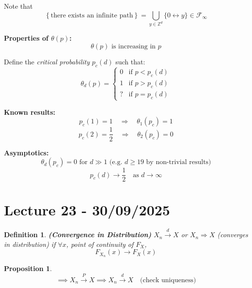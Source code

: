 \documentclass{article}
\newcommand{\1}{\mathds{1}}
\newtheorem{proposition}[theorem]{Proposition}
\newtheorem{definition}[theorem]{Definition}
\begin{document}
Note that
\[
\left\{ \text{there exists an infinite path} \right\} 
= \bigcup_{y \in \mathbb{Z}^d} \{ 0 \leftrightarrow y \} \in \mathcal{F}_\infty
\]

\bigskip

\textbf{Properties of \( \theta(p) \):}
\[
\theta(p) \text{ is increasing in } p
\]

Define the \textit{critical probability} \( p_c(d) \) such that:
\[
\theta_d(p) = 
\begin{cases}
0 & \text{if } p < p_c(d) \\
1 & \text{if } p > p_c(d) \\
? & \text{if } p = p_c(d)
\end{cases}
\]

\bigskip

\textbf{Known results:}
\[
p_c(1) = 1 \quad \Rightarrow \quad \theta_1(p_c) = 1
\]
\[
p_c(2) = \frac{1}{2} \quad \Rightarrow \quad \theta_2(p_c) = 0
\]

\bigskip

\textbf{Asymptotics:}
\[
\theta_d(p_c) = 0 \text{ for } d \gg 1 \text{ (e.g. } d \geq 19 \text{ by non-trivial results)}
\]
\[
p_c(d) \to \frac{1}{2} \quad \text{as } d \to \infty
\]
\section{Lecture 23 - 30/09/2025}
\begin{definition}\textbf{(Convergence in Distribution)} \( X_n \xrightarrow{d} X \) or \( X_n \Rightarrow X \) (converges in distribution) if \(\forall x\), point of continuity of \(F_X\),
\[
F_{X_n}(x) \to F_X(x)
\]
\end{definition}
\begin{proposition}
    \[
\implies X_n \xrightarrow{P} X \implies X_n \xrightarrow{d} X \quad \text{(check uniqueness)}
\]
\end{proposition}
\end{document}
